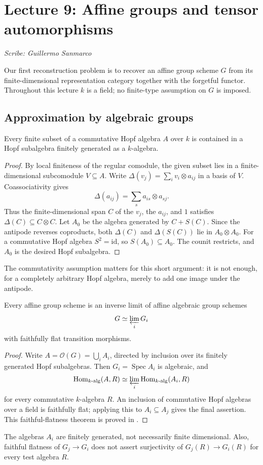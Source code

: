 \section{Lecture 9: Affine groups and tensor automorphisms}\label{lec9}
\noindent\textit{Scribe: Guillermo Sanmarco}


Our first reconstruction problem is to recover an affine group scheme $G$ from its finite-dimensional representation category together with the forgetful functor. Throughout this lecture $k$ is a field; no finite-type assumption on $G$ is imposed.

\subsection*{Approximation by algebraic groups}
\begin{proposition}\label{prop:hopf-finite-generation}
Every finite subset of a commutative Hopf algebra $A$ over $k$ is contained in a Hopf subalgebra finitely generated as a $k$-algebra.
\end{proposition}
\begin{proof}
By local finiteness of the regular comodule, the given subset lies in a finite-dimensional subcomodule $V\subseteq A$. Write $\Delta(v_j)=\sum_i v_i\otimes a_{ij}$ in a basis of $V$. Coassociativity gives
\[
 \Delta(a_{ij})=\sum_s a_{is}\otimes a_{sj}.
\]
Thus the finite-dimensional span $C$ of the $v_j$, the $a_{ij}$, and $1$ satisfies $\Delta(C)\subseteq C\otimes C$. Let $A_0$ be the algebra generated by $C+S(C)$. Since the antipode reverses coproducts, both $\Delta(C)$ and $\Delta(S(C))$ lie in $A_0\otimes A_0$. For a commutative Hopf algebra $S^2=\mathrm{id}$, so $S(A_0)\subseteq A_0$. The counit restricts, and $A_0$ is the desired Hopf subalgebra.
\end{proof}
The commutativity assumption matters for this short argument: it is not enough, for a completely arbitrary Hopf algebra, merely to add one image under the antipode.

\begin{corollary}\label{cor:group-inverse-limit}
Every affine group scheme is an inverse limit of affine algebraic group schemes
\[
 G\simeq\varprojlim_i G_i
\]
with faithfully flat transition morphisms.
\end{corollary}
\begin{proof}
Write $A=\mathcal O(G)=\bigcup_iA_i$, directed by inclusion over its finitely generated Hopf subalgebras. Then $G_i=\operatorname{Spec}A_i$ is algebraic, and
\[
 \operatorname{Hom}_{k\text{-alg}}(A,R)
 \simeq\varprojlim_i\operatorname{Hom}_{k\text{-alg}}(A_i,R)
\]
for every commutative $k$-algebra $R$. An inclusion of commutative Hopf algebras over a field is faithfully flat; applying this to $A_i\subseteq A_j$ gives the final assertion. This faithful-flatness theorem is proved in \cite[Chapter VI, Section 11]{milneAGS}.
\end{proof}
The algebras $A_i$ are finitely generated, not necessarily finite dimensional. Also, faithful flatness of $G_j\to G_i$ does not assert surjectivity of $G_j(R)\to G_i(R)$ for every test algebra $R$.

